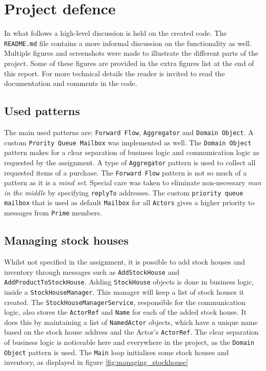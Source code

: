 \chapter{Project defence}
\label{ch:project_defence}

In what follows a high-level discussion is held on the created code.
The \texttt{README.md} file contains a more informal discussion on the functionality as well.
Multiple figures and screenshots were made to illustrate the different parts of the project.
Some of these figures are provided in the extra figures list at the end of this report.
For more technical details the reader is invited to read the documentation and comments in the code.



\section{Used patterns}
\label{sec:main_patterns}

The main used patterns are: \texttt{Forward Flow}, \texttt{Aggregator} and \texttt{Domain Object}.
A custom \texttt{Pr\-ority Queue Mailbox} was implemented as well.
The \texttt{Domain Object} pattern makes for a clear separation of business logic and communication logic as requested by the assignment.
A type of \texttt{Aggregator} pattern is used to collect all requested items of a purchase.
The \texttt{Forward Flow} pattern is not so much of a pattern as it is a \textit{mind set}.
Special care was taken to eliminate non-necessary \textit{man in the middle} by specifying \texttt{replyTo} addresses.
The custom \texttt{priority queue mailbox} that is used as default \texttt{Mailbox} for all \texttt{Actors} gives a higher priority to messages from \texttt{Prime} members.



\section{Managing stock houses}
\label{sec:managing_stock}

Whilst not specified in the assignment, it is possible to add stock houses and inventory through messages such as \texttt{AddStockHouse} and \texttt{AddProductToStockHouse}.
Adding \texttt{StockHouse} objects is done in business logic, inside a \texttt{StockHouseManager}.
This manager will keep a list of stock houses it created.
The \texttt{StockHouseManagerService}, responsible for the communication logic, also stores the \texttt{ActorRef} and \texttt{Name} for each of the added stock house.
It does this by maintaining a list of \texttt{NamedActor} objects, which have a unique name based on the stock house address and the Actor's \texttt{ActorRef}.
The clear separation of business logic is noticeable here and everywhere in the project, as the \texttt{Domain Object} pattern is used.
The \texttt{Main} loop initialises some stock houses and inventory, as displayed in figure \ref{fig:managing_stockhouse}


